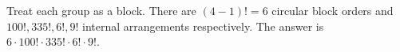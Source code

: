 Treat each group as a block. There are $(4-1)!=6$ circular block orders and $100!,335!,6!,9!$ internal arrangements respectively. The answer is $\boxed{6\cdot100!\cdot335!\cdot6!\cdot9!}$.
